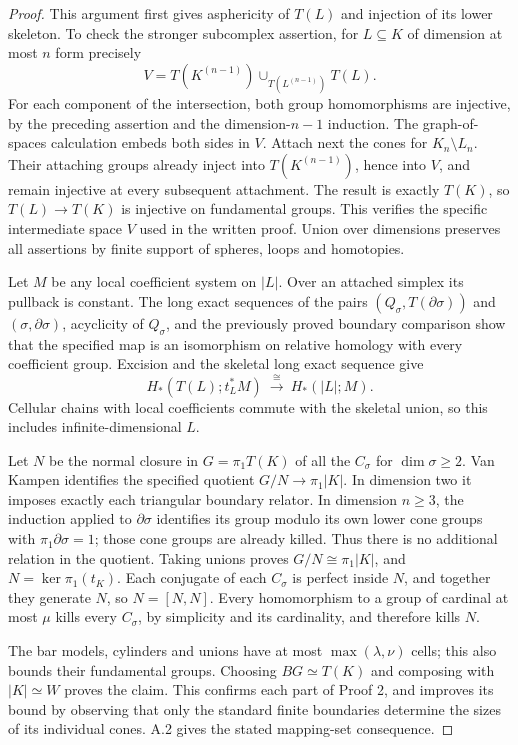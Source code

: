 \begin{proof}
This argument first gives asphericity of $T(L)$ and injection of its
lower skeleton. To check the stronger subcomplex assertion, for
$L\subseteq K$ of dimension at most $n$ form precisely
\[
 V=T(K^{(n-1)})\cup_{T(L^{(n-1)})}T(L).
\]
For each component of the intersection, both group homomorphisms are
injective, by the preceding assertion and the dimension-$n-1$
induction. The graph-of-spaces calculation embeds both sides in $V$.
Attach next the cones for $K_n\setminus L_n$. Their attaching groups
already inject into $T(K^{(n-1)})$, hence into $V$, and remain injective
at every subsequent attachment. The result is exactly $T(K)$, so
$T(L)\to T(K)$ is injective on fundamental groups. This verifies the
specific intermediate space $V$ used in the written proof. Union over
dimensions preserves all assertions by finite support of spheres,
loops and homotopies.

Let $M$ be any local coefficient system on $|L|$. Over an attached
simplex its pullback is constant. The long exact sequences of the pairs
$(Q_\sigma,T(\partial\sigma))$ and $(\sigma,\partial\sigma)$,
acyclicity of $Q_\sigma$, and the previously proved boundary comparison
show that the specified map is an isomorphism on relative homology
with every coefficient group. Excision and the skeletal long exact
sequence give
\[
 H_*(T(L);t_L^*M)\ \xrightarrow{\cong}\ H_*(|L|;M).
\]
Cellular chains with local coefficients commute with the skeletal
union, so this includes infinite-dimensional $L$.

Let $N$ be the normal closure in $G=\pi_1T(K)$ of all the $C_\sigma$
for $\dim\sigma\geq2$. Van Kampen identifies the specified quotient
$G/N\to\pi_1|K|$. In dimension two it imposes exactly each triangular
boundary relator. In dimension $n\geq3$, the induction applied to
$\partial\sigma$ identifies its group modulo its own lower cone groups
with $\pi_1\partial\sigma=1$; those cone groups are already killed.
Thus there is no additional relation in the quotient. Taking unions
proves $G/N\cong\pi_1|K|$, and $N=\ker\pi_1(t_K)$. Each conjugate
of each $C_\sigma$ is perfect inside $N$, and together they generate
$N$, so $N=[N,N]$. Every homomorphism to a group of cardinal at most
$\mu$ kills every $C_\sigma$, by simplicity and its cardinality, and
therefore kills $N$.

The bar models, cylinders and unions have at most
$\max(\lambda,\nu)$ cells; this also bounds their fundamental groups.
Choosing $BG\simeq T(K)$ and composing with $|K|\simeq W$ proves the
claim. This confirms each part of Proof 2, and improves its bound by
observing that only the standard finite boundaries determine the sizes
of its individual cones. A.2 gives the stated mapping-set consequence.
\end{proof}

